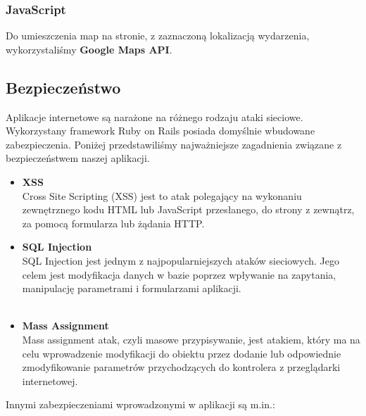       \subsubsection{JavaScript}
      Do umieszczenia map na stronie, z zaznaczoną lokalizacją wydarzenia, wykorzystaliśmy \textbf{Google Maps API}.

      

    \subsection{Bezpieczeństwo}
    Aplikacje internetowe są narażone na różnego rodzaju ataki sieciowe. Wykorzystany framework Ruby on Rails posiada domyślnie wbudowane zabezpieczenia. Poniżej przedstawiliśmy najważniejsze zagadnienia związane z bezpieczeństwem naszej aplikacji.
      \begin{itemize}
        \item \textbf{XSS}\\ 
        Cross Site Scripting (XSS) jest to atak polegający na wykonaniu zewnętrznego kodu HTML lub JavaScript przesłanego, do strony z zewnątrz, za pomocą formularza lub żądania HTTP.

        
        \clearpage
        \item \textbf{SQL Injection}\\ 
        SQL Injection jest jednym z najpopularniejszych ataków sieciowych. Jego celem jest modyfikacja danych w bazie poprzez wpływanie na zapytania, manipulację parametrami i formularzami aplikacji.\\\\
        

        \item \textbf{Mass Assignment} \\ 
        Mass assignment atak, czyli masowe przypisywanie, jest atakiem, który ma na celu wprowadzenie modyfikacji do obiektu przez dodanie lub odpowiednie zmodyfikowanie parametrów przychodzących do kontrolera z przeglądarki internetowej.\\
        
      \end{itemize}
    Innymi zabezpieczeniami wprowadzonymi w aplikacji są m.in.:
